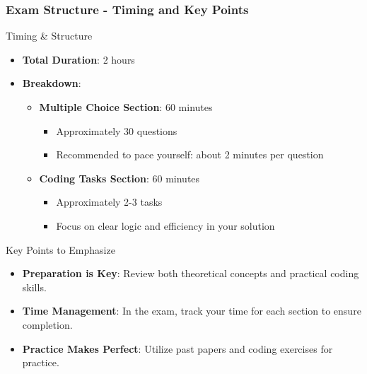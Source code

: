 \documentclass[aspectratio=169]{beamer}
\begin{document}
\begin{frame}[fragile]
    \frametitle{Exam Structure - Timing and Key Points}
    \begin{block}{Timing \& Structure}
        \begin{itemize}
            \item \textbf{Total Duration}: 2 hours
            \item \textbf{Breakdown}:
                \begin{itemize}
                    \item \textbf{Multiple Choice Section}: 60 minutes
                        \begin{itemize}
                            \item Approximately 30 questions
                            \item Recommended to pace yourself: about 2 minutes per question
                        \end{itemize}
                    \item \textbf{Coding Tasks Section}: 60 minutes
                        \begin{itemize}
                            \item Approximately 2-3 tasks
                            \item Focus on clear logic and efficiency in your solution
                        \end{itemize}
                \end{itemize}
        \end{itemize}
    \end{block}

    \begin{block}{Key Points to Emphasize}
        \begin{itemize}
            \item \textbf{Preparation is Key}: Review both theoretical concepts and practical coding skills.
            \item \textbf{Time Management}: In the exam, track your time for each section to ensure completion.
            \item \textbf{Practice Makes Perfect}: Utilize past papers and coding exercises for practice.
        \end{itemize}
    \end{block}
\end{frame}
\end{document}
